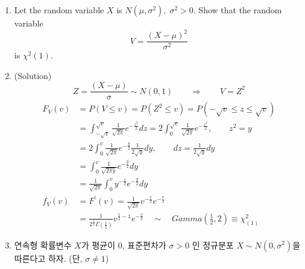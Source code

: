 \documentclass{oblivoir}
\begin{document}
\begin{enumerate}
\item
Let the random variable $X$ is $N(\mu, \sigma^2), \; \sigma^2 > 0$. Show that the random variable
$$
V = \frac{(X-\mu)^2}{\sigma^2}
$$
is $\chi^2 (1)$.
\item[] (Solution)
$$
Z =  \frac{(X-\mu)}{\sigma} \sim N(0,1) \qquad \Rightarrow \qquad V = Z^2
$$
\begin{align*}
F_V(v) &= P(V \leq v) = P(Z^2 \leq v) = P(-\sqrt{v} \leq z \leq \sqrt{v}) \\
&= \int_{-\sqrt{v}}^{\sqrt{v}} \frac{1}{\sqrt{2\pi}} e^{-\frac{z^2}{2}} dz = 2 \int_0^{\sqrt{v}}  \frac{1}{\sqrt{2\pi}} e^{-\frac{z^2}{2}} , \qquad z^2 = y \\
&= 2 \int_0^{v}  \frac{1}{\sqrt{2\pi}} e^{-\frac{y}{2}} \frac{1}{2\sqrt{y}} dy, \qquad dz =  \frac{1}{2\sqrt{y}} dy \\
&= \int_0^{v}  \frac{1}{\sqrt{2\pi y}} e^{-\frac{y}{2}} dy \\
&= \frac{1}{\sqrt{2\pi}} \int_0^{v} y^{-\frac{1}{2}}e^{-\frac{y}{2}} dy \\
f_V(v) &= F^{\prime} (v) = \frac{1}{\sqrt{2\pi}} v^{-\frac{1}{2}}e^{-\frac{v}{2}} \\
&= \frac{1}{2^{\frac{1}{2}} \Gamma(\frac{1}{2})} v^{\frac{1}{2} - 1} e^{-\frac{v}{2}} \quad \sim \quad Gamma(\frac{1}{2}, 2) \equiv \chi^2_{(1)}
\end{align*}

\item
연속형 확률변수 $X$가 평균이 0, 표준편차가 $\sigma > 0 $ 인 정규분포 $X \sim N(0,\sigma^2)$을
따른다고 하자. (단, $\sigma \ne 1$)


\end{enumerate}
\end{document}
